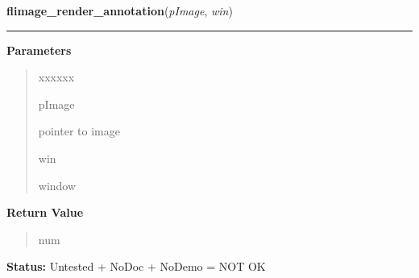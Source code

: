 \hspace{.8\funcindent}\begin{boxedminipage}{\funcwidth}

    \raggedright \textbf{flimage\_render\_annotation}(\textit{pImage}, \textit{win})

    \vspace{-1.5ex}

    \rule{\textwidth}{0.5\fboxrule}
\setlength{\parskip}{2ex}
\setlength{\parskip}{1ex}
      \textbf{Parameters}
      \vspace{-1ex}

      \begin{quote}
        \begin{Ventry}{xxxxxx}

          \item[pImage]

          pointer to image

          \item[win]

          window

        \end{Ventry}

      \end{quote}

      \textbf{Return Value}
    \vspace{-1ex}

      \begin{quote}
      num

      \end{quote}

\textbf{Status:} Untested + NoDoc + NoDemo = NOT OK



    \end{boxedminipage}

    \label{xformslib:flflimage:flimage_error}

    \vspace{0.5ex}

